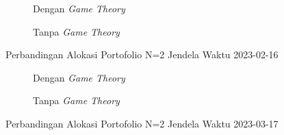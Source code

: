% 
% 
% 
% 

\begin{figure}[!htbp]\centering\begin{subfigure}[b]{0.48\textwidth}\centering


\caption{Dengan \textit{Game Theory}}\end{subfigure}\hfill\begin{subfigure}[b]{0.48\textwidth}\centering


\caption{Tanpa \textit{Game Theory}}\end{subfigure}\caption{Perbandingan Alokasi Portofolio N=2 Jendela Waktu 2023-02-16}\label{fig:window_2023_02_16}\end{figure}

\begin{figure}[!htbp]\centering\begin{subfigure}[b]{0.48\textwidth}\centering


\caption{Dengan \textit{Game Theory}}\end{subfigure}\hfill\begin{subfigure}[b]{0.48\textwidth}\centering


\caption{Tanpa \textit{Game Theory}}\end{subfigure}\caption{Perbandingan Alokasi Portofolio N=2 Jendela Waktu 2023-03-17}\label{fig:window_2023_03_17}\end{figure}

